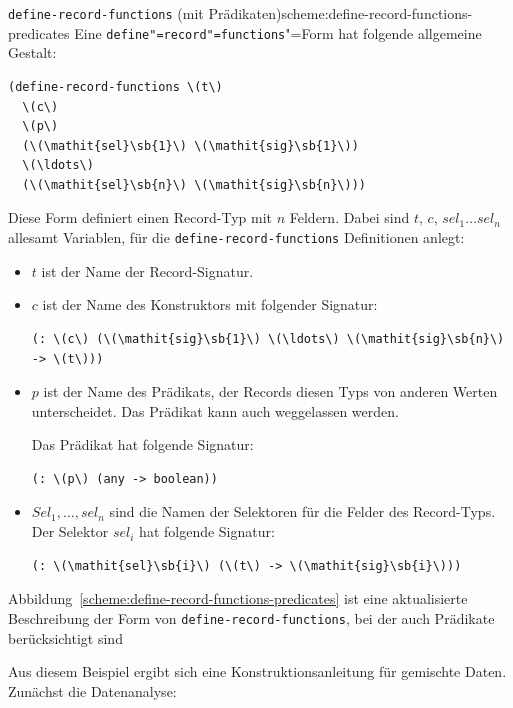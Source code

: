 \begin{feature}{\texttt{define-record-functions} (mit Prädikaten)}{scheme:define-record-functions-predicates}
Eine \texttt{define"=record"=functions}"=Form
hat folgende allgemeine Gestalt:
%
\begin{lstlisting}
(define-record-functions \(t\)
  \(c\)
  \(p\)
  (\(\mathit{sel}\sb{1}\) \(\mathit{sig}\sb{1}\))
  \(\ldots\)
  (\(\mathit{sel}\sb{n}\) \(\mathit{sig}\sb{n}\)))
\end{lstlisting}
%
Diese Form definiert einen Record-Typ mit $n$ Feldern.
Dabei sind $t$, $c$, $\mathit{sel}_1 \ldots \mathit{sel}_n$ allesamt Variablen, für die
\lstinline{define-record-functions} Definitionen anlegt:
%
\begin{itemize}
\item $t$ ist der Name der Record-Signatur.
\item $c$ ist der Name des Konstruktors mit 
  folgender Signatur:
%  
\begin{lstlisting}
(: \(c\) (\(\mathit{sig}\sb{1}\) \(\ldots\) \(\mathit{sig}\sb{n}\) -> \(t\)))
\end{lstlisting}
\item $p$ ist der Name des Prädikats, der Records diesen Typs von
  anderen Werten unterscheidet.  Das Prädikat kann auch weggelassen
  werden.

    Das Prädikat hat folgende Signatur:
\begin{lstlisting}
(: \(p\) (any -> boolean))
\end{lstlisting}
\item $\mathit{Sel}_1, \ldots, \mathit{sel}_n$ sind die Namen der Selektoren für die Felder
  des Record-Typs.  Der Selektor $\mathit{sel}_i$ hat folgende Signatur:
% 
\begin{lstlisting}
(: \(\mathit{sel}\sb{i}\) (\(t\) -> \(\mathit{sig}\sb{i}\)))
\end{lstlisting}
\end{itemize}
%
\end{feature}
%
Abbildung~\ref{scheme:define-record-functions-predicates} ist eine
aktualisierte Beschreibung der Form von
\lstinline{define-record-functions}, bei der auch Prädikate
berücksichtigt sind

Aus diesem Beispiel ergibt sich eine Konstruktionsanleitung für
gemischte Daten.  Zunächst die Datenanalyse:


